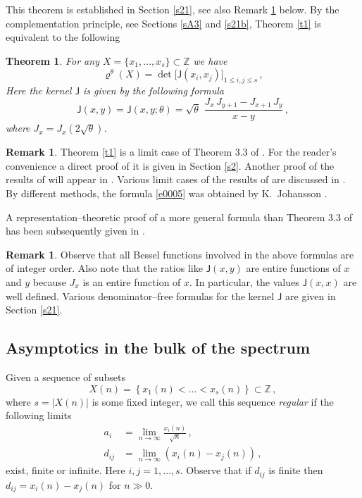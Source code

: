 \documentclass[12pt]{amsart}
\newcommand{\J}{\mathsf{J}}
\newcommand{\brh}{\boldsymbol{\varrho}}
\newcommand{\Z}{\mathbb{Z}}
\newcommand{\ix}{\theta}
\theoremstyle{plain}
\newtheorem{theorem}{Theorem}
\theoremstyle{definition}
\newtheorem{remark}[lemma]{Remark}
\numberwithin{equation}{section}
\begin{document}
This theorem is established in Section \ref{s21}, see also
Remark \ref{r11} below.  By the complementation principle,
see Sections \ref{sA3} and \ref{s21b}, Theorem \ref{t1} is
equivalent to the following 

\begin{theorem}\label{t1b}
For any $X=\{x_1,\dots,x_s\}\subset \Z$
we have 
%
\begin{equation}\label{e0005}
\brh^\ix(X)=
\det \Big[\J(x_i,x_j)\Big]_{1\le i,j \le s}\,,
\end{equation}
%
Here the kernel $\J$ is given by the following formula
%
\begin{equation}\label{e212}
\J(x,y)=\J(x,y;\ix)=\sqrt{\ix}\,\, \frac{J_x\, J_{y+1} - J_{x+1} \, J_{y}}
{x-y} \,,
\end{equation}
%
where $J_x=J_x(2\sqrt\ix)$. 
\end{theorem}


\begin{remark}\label{r11}
Theorem \ref{t1} is a limit case of Theorem 3.3  of \cite{BO}.
For the reader's convenience a direct proof of it is given
in Section \ref{s2}.  Another proof of the results of \cite{BO}
will appear in \cite{BO2}. Various limit cases of the results
of \cite{BO} are discussed in \cite{BO3}. 
By different methods, the formula \eqref{e0005} was obtained by
K.~Johansson \cite{J2}.

A representation--theoretic
proof of a more general formula than Theorem 3.3 of \cite{BO}
has been subsequently  given in \cite{O2}. 
\end{remark}

\begin{remark}
Observe that all Bessel functions involved 
in the above formulas  are of integer order.
Also note that the ratios like  $\J(x,y)$ are entire functions of $x$ and $y$
because  $J_x$ is an entire function of $x$. In particular, the values $\J(x,x)$
are well defined. Various
denominator--free formulas for the kernel $\J$ are given  in Section \ref{s21}.
\end{remark}

\subsection{Asymptotics in the bulk of the spectrum}\label{s13} 

Given a sequence of subsets
%
\begin{equation*}
X(n)=\left\{x_1(n)<\dots<x_s(n)\right\}\subset\Z\,, 
\end{equation*}
%
where $s=|X(n)|$ is  some fixed integer, we call this sequence {\em regular} 
 if the following limits 
%
\begin{align}
a_i &= \lim_{n\to\infty} \frac{x_i(n)}{\sqrt{n}}\,, \label{e14}\\
d_{ij}&=\lim_{n\to\infty}\left(x_i(n)-x_j(n)\right)\,, \label{e15}
\end{align}
%
exist, finite or infinite. Here $i,j=1,\dots,s$. Observe that if $d_{ij}$ is finite then
$d_{ij}=x_i(n)-x_j(n)$ for $n\gg 0$.
\end{document}
